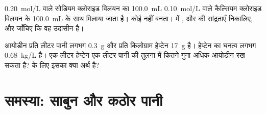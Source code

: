 \begin{exercise}[$\star\star\star$]\label{exo:g11:dissolution:14}
\qty{0.20}{mol/L} वाले सोडियम क्लोराइड विलयन का \qty{100.0}{mL}
\qty{0.10}{mol/L} वाले कैल्सियम क्लोराइड विलयन के \qty{100.0}{mL} के साथ
मिलाया जाता है। कोई  नहीं बनता।  में
,  और  की सांद्रताएँ निकालिए, और जाँचिए कि वह
उदासीन है।
\end{exercise}

\begin{exercise}[$\star\star\star$]\label{exo:g11:dissolution:15}
आयोडीन प्रति लीटर पानी लगभग \qty{0.3}{g} और प्रति किलोग्राम हेप्टेन
\qty{17}{g}  है। हेप्टेन का घनत्व लगभग
\qty{0.68}{kg/L} है। एक लीटर हेप्टेन एक लीटर पानी की तुलना में कितने गुना अधिक
आयोडीन रख सकता है?  के लिए इसका क्या अर्थ है?
\end{exercise}

\section{समस्या: साबुन और कठोर पानी}

